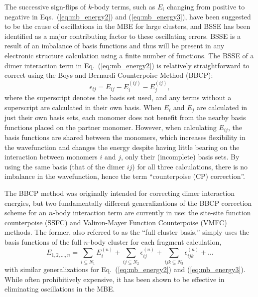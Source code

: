     The successive sign-flips of $k$-body terms, such as $E_{i}$ changing from positive to negative in Eqs.~(\ref{eq:mb_energy2}) and (\ref{eq:mb_energy3}), have been suggested to be the cause of oscillations in the MBE for large clusters,\cite{Ouyang2014} and BSSE has been identified as a major contributing factor to these oscillating errors. BSSE is a result of an imbalance of basis functions and thus will be present in any electronic structure calculation using a finite number of functions. The BSSE of a dimer interaction term in Eq.~(\ref{eq:mb_energy2}) is relatively straightforward to correct using the Boys and Bernardi Counterpoise Method (BBCP):\cite{Boys1970}
    \begin{equation} \label{eq:Boys}
        \epsilon_{ij} = E_{ij} - E_{i}^{(ij)} - E_j^{(ij)},
    \end{equation}
    where the superscript denotes the basis set used, and any terms without a superscript are calculated in their own basis. When $E_i$ and $E_j$ are calculated in just their own basis sets, each monomer does not benefit from the nearby basis functions placed on the partner monomer.  However, when calculating $E_{ij}$, the basis functions are shared between the monomers, which increases flexibility in the wavefunction and changes the energy despite having little bearing on the interaction between monomers $i$ and $j$, only their (incomplete) basis sets. By using the same basis (that of the dimer $ij$) for all three calculations, there is no imbalance in the wavefunction, hence the term ``counterpoise (CP) correction''.
    
    The BBCP method was originally intended for correcting dimer interaction energies, but two fundamentally different generalizations of the BBCP correction scheme for an $n$-body interaction term are currently in use: the site-site function counterpoise (SSFC) and Valiron-Mayer Function Counterpoise (VMFC) methods.\cite{Wells1983,Valiron1997} The former, also referred to as the ``full cluster basis,'' simply uses the basis functions of the full $n$-body cluster for each fragment calculation,
    \begin{equation} \label{eq:SSFC}
        E_{1,2,\ldots ,n} = \sum_{i\subseteq N_1}E_{i}^{(n)} + \sum_{ij\subseteq N_2}\epsilon_{ij}^{(n)} + \sum_{ijk\subseteq N_3}\epsilon_{ijk}^{(n)} + \ldots 
    \end{equation}
with similar generalizations for Eq.~(\ref{eq:mb_energy2}) and (\ref{eq:mb_energy3}). While often prohibitively expensive, it has been shown to be effective in eliminating oscillations in the MBE.\cite{Ouyang2014,Richard2018a}

